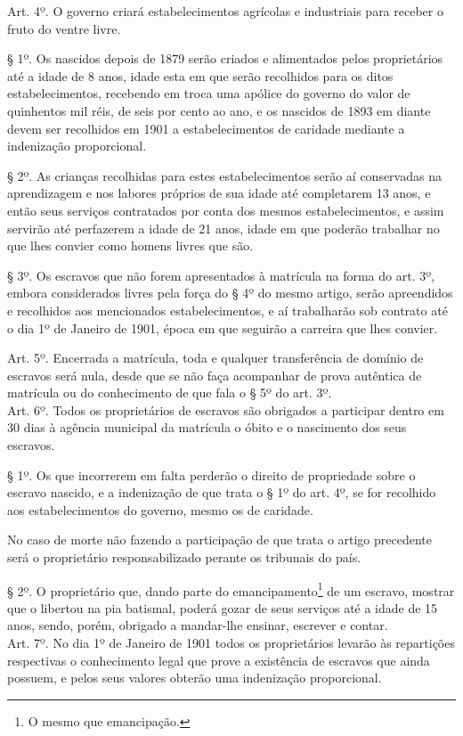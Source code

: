 Art. 4º. O governo criará estabelecimentos agrícolas e industriais para
receber o fruto do ventre livre.

§ 1º. Os nascidos depois de 1879 serão criados e alimentados pelos
proprietários até a idade de 8 anos, idade esta em que serão recolhidos
para os ditos estabelecimentos, recebendo em troca uma apólice do
governo do valor de quinhentos mil réis, de seis por cento ao ano, e os
nascidos de 1893 em diante devem ser recolhidos em 1901 a
estabelecimentos de caridade mediante a indenização proporcional.

§ 2º. As crianças recolhidas para estes estabelecimentos serão aí
conservadas na aprendizagem e nos labores próprios de sua idade até
completarem 13 anos, e então seus serviços contratados por conta dos
mesmos estabelecimentos, e assim servirão até perfazerem a idade de 21
anos, idade em que poderão trabalhar no que lhes convier como homens
livres que são.

§ 3º. Os escravos que não forem apresentados à matrícula na forma do
art. 3º, embora considerados livres pela força do § 4º do mesmo artigo,
serão apreendidos e recolhidos aos mencionados estabelecimentos, e aí
trabalharão sob contrato até o dia 1º de Janeiro de 1901, época em que
seguirão a carreira que lhes convier.

Art. 5º. Encerrada a matrícula, toda e qualquer transferência de domínio
de escravos será nula, desde que se não faça acompanhar de prova
autêntica de matrícula ou do conhecimento de que fala o § 5º do art.
3º.\\
Art. 6º. Todos os proprietários de escravos são obrigados a participar
dentro em 30 dias à agência municipal da matrícula o óbito e o
nascimento dos seus escravos.

§ 1º. Os que incorrerem em falta perderão o direito de propriedade sobre
o escravo nascido, e a indenização de que trata o § 1º do art. 4º, se
for recolhido aos estabelecimentos do governo, mesmo os de caridade.

No caso de morte não fazendo a participação de que trata o artigo
precedente será o proprietário responsabilizado perante os tribunais do
país.

§ 2º. O proprietário que, dando parte do emancipamento\footnote{O
  mesmo que emancipação.} de um escravo, mostrar que o libertou na pia
batismal, poderá gozar de seus serviços até a idade de 15 anos, sendo,
porém, obrigado a mandar-lhe ensinar, escrever e contar.\\
Art. 7º. No dia 1º de Janeiro de 1901 todos os proprietários levarão às
repartições respectivas o conhecimento legal que prove a existência de
escravos que ainda possuem, e pelos seus valores obterão uma indenização
proporcional.

